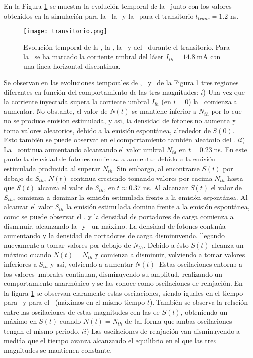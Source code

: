 	En la Figura \ref{Img:transitorio} se muestra la evolución temporal de la \I\ junto con los valores obtenidos en la simulación para la \n\, la \s\ y la \fase\ para el transitorio $t_{trans} = 1.2$ ns.

		\begin{figure}[H]
			\centering
			\texttt{[image: transitorio.png]}
			\caption{\label{Img:transitorio}Evolución temporal de la \I, la \s, la \n\ y del \chirp\ durante el transitorio. Para la \I\ se ha marcado la corriente umbral del láser $I_{th} = 14.8$ mA con una línea horizontal discontinua.}	
		\end{figure}
		
		Se observan en las evoluciones temporales de \n, \s\ y \fase\ de la Figura \ref{Img:transitorio} tres regiones diferentes en función del comportamiento de las tres magnitudes: $i$) Una vez que la corriente inyectada supera la corriente umbral $I_{th}$ (en $t=0$) la \n\ comienza a aumentar. No obstante, el valor de $N(t)$ se mantiene inferior a $N_{th}$ por lo que no se produce emisión estimulada, y así, la densidad de fotones no aumenta y toma valores aleatorios, debido a la emisión espontánea, alrededor de $S(0)$. Esto también se puede observar en el comportamiento también aleatorio del \chirp. $ii$) La \n\ continua aumentando alcanzando el valor umbral $N_{th}$ en $t = 0.23$ ns. En este punto la densidad de fotones comienza a aumentar debido a la emisión estimulada producida al superar $N_{th}$. Sin embargo, al encontrarse $S(t)$ por debajo de $S_{th}$, $N(t)$ continua creciendo tomando valores por encima $N_{th}$ hasta que $S(t)$ alcanza el valor de $S_{th}$, en $t \approx 0.37$ ns. Al alcanzar $S(t)$ el valor de $S_{th}$, comienza a dominar la emisión estimulada frente a la emisión espontánea. Al alcanzar el valor $S_{th}$ la emisión estimulada domina frente a la emisión espontánea, como se puede observar el \chirp, y la densidad de portadores de carga comienza a disminuir, alcanzando la \n\ y \chirp\ un máximo. La densidad de fotones continúa aumentando y la densidad de portadores de carga disminuyendo, llegando nuevamente a tomar valores por debajo de $N_{th}$. Debido a ésto $S(t)$ alcanza un máximo cuando $N(t) = N_{th}$ y comienza a disminuir, volviendo a tomar valores inferiores a $S_{th}$ y así, volviendo a aumentar $N(t)$. Estas oscilaciones entorno a los valores umbrales continuan, disminuyendo su amplitud, realizando un comportamiento anarmónico y se las conoce como oscilaciones de relajación. En la figura \ref{Img:transitorio} se observan claramente estas oscilaciones, siendo iguales en el tiempo para \n\ y para el \chirp\ (máximos en el mismo tiempo $t$). También se observa la relación entre las oscilaciones de estas magnitudes con las de $S(t)$, obteniendo un máximo en $S(t)$ cuando $N(t) = N_{th}$ de tal forma que ambas oscilaciones tengan el mismo periodo. $ii$) Las oscilaciones de relajación van disminuyendo a medida que el tiempo avanza alcanzando el equilibrio en el que las tres magnitudes se mantienen constante.

